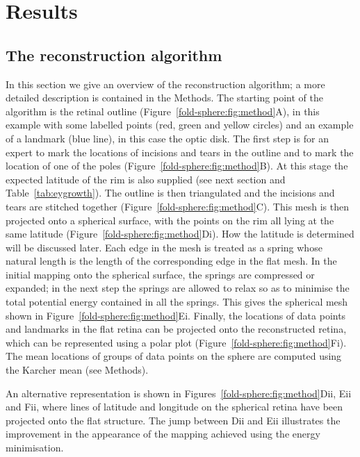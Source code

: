 \documentclass[10pt]{article}
\begin{document}
\section*{Results}

\subsection*{The reconstruction algorithm}

In this section we give an overview of the reconstruction algorithm; a
more detailed description is contained in the Methods. The starting
point of the algorithm is the retinal outline
(Figure~\ref{fold-sphere:fig:method}A), in this example with some
labelled points (red, green and yellow circles) and an example of a
landmark (blue line), in this case the optic disk.  The first step is
for an expert to mark the locations of incisions and tears in the
outline and to mark the location of one of the poles
(Figure~\ref{fold-sphere:fig:method}B). At this stage the expected
latitude of the rim is also supplied (see next section and
Table~\ref{tab:eygrowth}). The outline is then triangulated and the
incisions and tears are stitched together
(Figure~\ref{fold-sphere:fig:method}C). This mesh is then projected
onto a spherical surface, with the points on the rim all lying at the
same latitude (Figure~\ref{fold-sphere:fig:method}Di). How the
latitude is determined will be discussed later. Each edge in the mesh
is treated as a spring whose natural length is the length of the
corresponding edge in the flat mesh.  In the initial mapping onto the
spherical surface, the springs are compressed or expanded; in the next
step the springs are allowed to relax so as to minimise the total
potential energy contained in all the springs. This gives the
spherical mesh shown in
Figure~\ref{fold-sphere:fig:method}Ei. Finally, the locations of data
points and landmarks in the flat retina can be projected onto the
reconstructed retina, which can be represented using a polar plot
(Figure~\ref{fold-sphere:fig:method}Fi). The mean locations of groups
of data points on the sphere are computed using the Karcher mean (see
Methods).

An alternative representation is shown in
Figures~\ref{fold-sphere:fig:method}Dii, Eii and Fii, where lines of
latitude and longitude on the spherical retina have been projected
onto the flat structure. The jump between Dii and Eii illustrates the
improvement in the appearance of the mapping achieved using the energy
minimisation.
\end{document}
